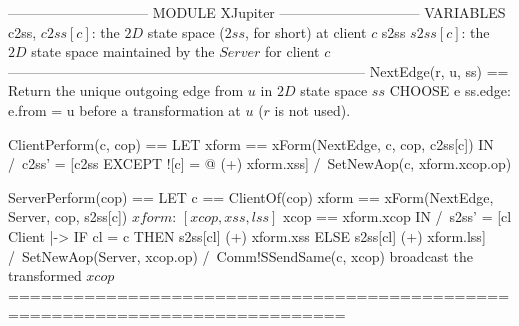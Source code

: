 \documentclass{article}
\begin{document}
\begin{tla}
------------------------------ MODULE XJupiter ------------------------------
VARIABLES c2ss, \* $c2ss[c]$: the $2D$ state space ($2ss$, for short) at client $c$ 
          s2ss  \* $s2ss[c]$: the $2D$ state space maintained by the $Server$ for client $c$
-----------------------------------------------------------------------------
NextEdge(r, u, ss) == \* Return the unique outgoing edge from $u$ in $2D$ state space $ss$ 
    CHOOSE e \in ss.edge: e.from = u \* before a transformation at $u$ ($r$ is not used). 

ClientPerform(c, cop) == 
    LET xform == xForm(NextEdge, c, cop, c2ss[c])
    IN  /\ c2ss' = [c2ss EXCEPT ![c] = @ (+) xform.xss]
        /\ SetNewAop(c, xform.xcop.op)

ServerPerform(cop) == 
    LET c == ClientOf(cop)
    xform == xForm(NextEdge, Server, cop, s2ss[c]) \* $xform$: $[xcop, xss, lss]$
     xcop == xform.xcop
    IN  /\ s2ss' = [cl \in Client |-> IF cl = c THEN s2ss[cl] (+) xform.xss 
                                                ELSE s2ss[cl] (+) xform.lss]
        /\ SetNewAop(Server, xcop.op)
        /\ Comm!SSendSame(c, xcop)  \* broadcast the transformed $xcop$ 
=============================================================================
\end{tla}
\end{document}
